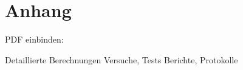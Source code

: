 


\section{Anhang}
 






PDF einbinden:

Detaillierte Berechnungen
Versuche, Tests
Berichte, Protokolle


